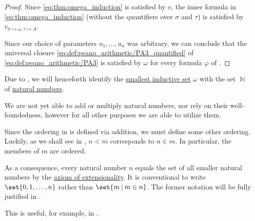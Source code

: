 \begin{proof}
  Since \eqref{eq:thm:omega_induction} is satisfied by \( v \), the inner formula in \eqref{eq:thm:omega_induction} (without the quantifiers over \( \sigma \) and \( \tau \)) is satisfied by \( v_{\sigma \mapsto \omega, \tau \mapsto A} \).

  Since our choice of parameters \( u_1, \ldots, u_n \) was arbitrary, we can conclude that the universal closure \eqref{eq:def:peano_arithmetic/PA3_quantified} of \eqref{eq:def:peano_arithmetic/PA3} is satisfied by \( \omega \) for every formula \( \varphi \) of .
\end{proof}

\begin{remark}\label{rem:set_theory_natural_numbers_without_operations}
  Due to , we will henceforth identify the \hyperref[thm:smallest_inductive_set_existence]{smallest inductive set} \( \omega \) with the set \( \BbbN \) of \hyperref[def:set_of_natural_numbers]{natural numbers}.

  We are not yet able to add or multiply natural numbers, nor rely on their well-foundedness, however for all other purposes we are able to utilize them.

  Since the ordering in  is defined via addition, we must define some other ordering. Luckily, as we shall see in , \( n < m \) corresponds to \( n \in m \). In particular, the members of \( m \) are ordered.

  As a consequence, every natural number \( n \) equals the set of all smaller natural numbers by the \hyperref[def:naive_set_theory/extensionality]{axiom of extensionality}. It is conventional to write \( \set{ 0, 1, \ldots, n } \) rather than \( \set{ m \given m \in n } \). The former notation will be fully justified in .

  This is useful, for example, in .
\end{remark}
